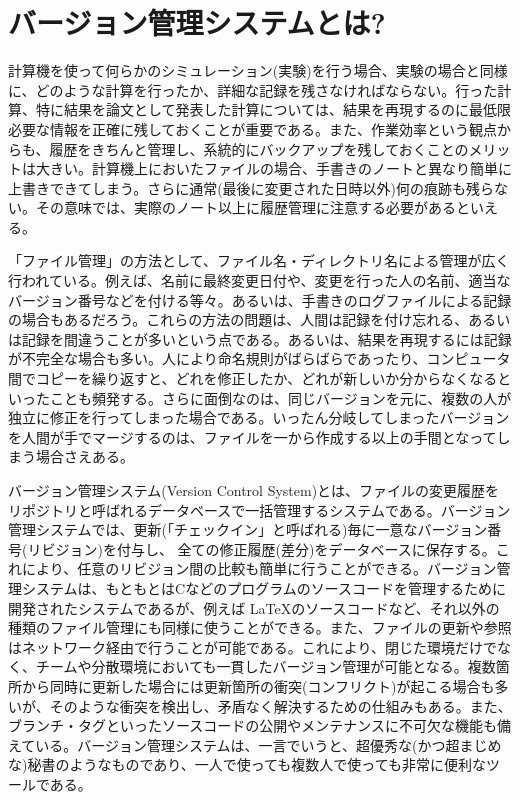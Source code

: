 \section{バージョン管理システムとは?}

計算機を使って何らかのシミュレーション(実験)を行う場合、実験の場合と同様に、どのような計算を行ったか、詳細な記録を残さなければならない。行った計算、特に結果を論文として発表した計算については、結果を再現するのに最低限必要な情報を正確に残しておくことが重要である。また、作業効率という観点からも、履歴をきちんと管理し、系統的にバックアップを残しておくことのメリットは大きい。計算機上においたファイルの場合、手書きのノートと異なり簡単に上書きできてしまう。さらに通常(最後に変更された日時以外)何の痕跡も残らない。その意味では、実際のノート以上に履歴管理に注意する必要があるといえる。

「ファイル管理」の方法として、ファイル名・ディレクトリ名による管理が広く行われている。例えば、名前に最終変更日付や、変更を行った人の名前、適当なバージョン番号などを付ける等々。あるいは、手書きのログファイルによる記録の場合もあるだろう。これらの方法の問題は、人間は記録を付け忘れる、あるいは記録を間違うことが多いという点である。あるいは、結果を再現するには記録が不完全な場合も多い。人により命名規則がばらばらであったり、コンピュータ間でコピーを繰り返すと、どれを修正したか、どれが新しいか分からなくなるといったことも頻発する。さらに面倒なのは、同じバージョンを元に、複数の人が独立に修正を行ってしまった場合である。いったん分岐してしまったバージョンを人間が手でマージするのは、ファイルを一から作成する以上の手間となってしまう場合さえある。

バージョン管理システム(Version Control System)とは、ファイルの変更履歴をリポジトリと呼ばれるデータベースで一括管理するシステムである。バージョン管理システムでは、更新(「チェックイン」と呼ばれる)毎に一意なバージョン番号(リビジョン)を付与し、
全ての修正履歴(差分)をデータベースに保存する。これにより、任意のリビジョン間の比較も簡単に行うことができる。バージョン管理システムは、もともとはCなどのプログラムのソースコードを管理するために開発されたシステムであるが、例えば \LaTeX のソースコードなど、それ以外の種類のファイル管理にも同様に使うことができる。また、ファイルの更新や参照はネットワーク経由で行うことが可能である。これにより、閉じた環境だけでなく、チームや分散環境においても一貫したバージョン管理が可能となる。複数箇所から同時に更新した場合には更新箇所の衝突(コンフリクト)が起こる場合も多いが、そのような衝突を検出し、矛盾なく解決するための仕組みもある。また、ブランチ・タグといったソースコードの公開やメンテナンスに不可欠な機能も備えている。バージョン管理システムは、一言でいうと、超優秀な(かつ超まじめな)秘書のようなものであり、一人で使っても複数人で使っても非常に便利なツールである。

